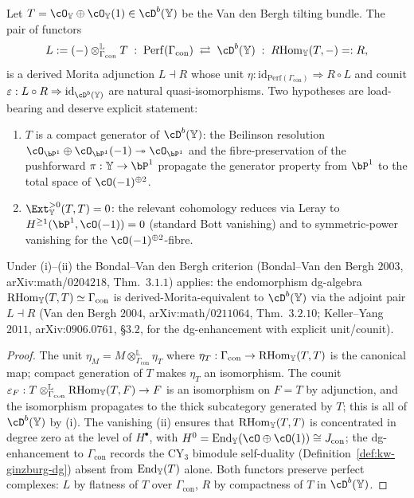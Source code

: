 \begin{theorem}
\label{thm:kw-derived-morita-adjoint}
Let $T = \cO_{\bY} \oplus \cO_{\bY}(1) \in \cD^b(\bY)$ be the Van den Bergh tilting bundle. The pair of functors
\[
 L := (-) \otimes^{\mathbb L}_{\Gamma_{\mathrm{con}}} T \;:\; \mathrm{Perf}(\Gamma_{\mathrm{con}}) \;\rightleftarrows\; \cD^b(\bY) \;:\; R\mathrm{Hom}_{\bY}(T, -) =: R,
\]
is a derived Morita adjunction $L \dashv R$ whose unit $\eta : \mathrm{id}_{\mathrm{Perf}(\Gamma_{\mathrm{con}})} \Rightarrow R \circ L$ and counit $\varepsilon : L \circ R \Rightarrow \mathrm{id}_{\cD^b(\bY)}$ are natural quasi-isomorphisms. Two hypotheses are load-bearing and deserve explicit statement:
\begin{enumerate}[label=(\roman*)]
 \item $T$ is a compact generator of $\cD^b(\bY)$: the Beilinson resolution $\cO_{\bP^1} \oplus \cO_{\bP^1}(-1) \twoheadrightarrow \cO_{\bP^1}$ and the fibre-preservation of the pushforward $\pi : \bY \to \bP^1$ propagate the generator property from $\bP^1$ to the total space of $\cO(-1)^{\oplus 2}$.
 \item $\Ext^{>0}_{\bY}(T, T) = 0$: the relevant cohomology reduces via Leray to $H^{\geq 1}(\bP^1, \cO(-1)) = 0$ (standard Bott vanishing) and to symmetric-power vanishing for the $\cO(-1)^{\oplus 2}$-fibre.
\end{enumerate}
Under (i)--(ii) the Bondal--Van den Bergh criterion (Bondal--Van den Bergh $2003$, arXiv:math/$0204218$, Thm.~$3.1.1$) applies: the endomorphism dg-algebra $\mathrm{RHom}_{\mathbb{Y}}(T, T) \simeq \Gamma_{\mathrm{con}}$ is derived-Morita-equivalent to $\cD^b(\bY)$ via the adjoint pair $L \dashv R$ (Van den Bergh $2004$, arXiv:math/$0211064$, Thm.~$3.2.10$; Keller--Yang $2011$, arXiv:$0906.0761$, §$3.2$, for the dg-enhancement with explicit unit/counit).
\end{theorem}

\begin{proof}
The unit $\eta_M = M \otimes^{\mathbb L}_{\Gamma_{\mathrm{con}}} \eta_T$ where $\eta_T : \Gamma_{\mathrm{con}} \to \mathrm{RHom}_{\mathbb{Y}}(T, T)$ is the canonical map; compact generation of $T$ makes $\eta_T$ an isomorphism. The counit $\varepsilon_F : T \otimes^{\mathbb L}_{\Gamma_{\mathrm{con}}} \mathrm{RHom}_{\mathbb{Y}}(T, F) \to F$ is an isomorphism on $F = T$ by adjunction, and the isomorphism propagates to the thick subcategory generated by $T$; this is all of $\cD^b(\bY)$ by (i). The vanishing (ii) ensures that $\mathrm{RHom}_{\mathbb{Y}}(T, T)$ is concentrated in degree zero at the level of $H^\bullet$, with $H^0 = \mathrm{End}_{\bY}(\cO \oplus \cO(1)) \cong J_{\mathrm{con}}$; the dg-enhancement to $\Gamma_{\mathrm{con}}$ records the CY$_3$ bimodule self-duality (Definition~\ref{def:kw-ginzburg-dg}) absent from $\mathrm{End}_{\mathbb{Y}}(T)$ alone. Both functors preserve perfect complexes: $L$ by flatness of $T$ over $\Gamma_{\mathrm{con}}$, $R$ by compactness of $T$ in $\cD^b(\bY)$.
\end{proof}


